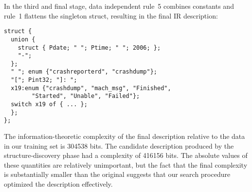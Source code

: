 

In the third and final stage, 
data independent rule~5 combines constants 
and rule~1 flattens the singleton struct, resulting in the final IR
description:

{\small
\begin{verbatim}
struct {
  union {
    struct { Pdate; " "; Ptime; " "; 2006; };
    "-";
  };
  " "; enum {"crashreporterd", "crashdump"};
  "["; Pint32; "]: ";
  x19:enum {"crashdump", "mach_msg", "Finished", 
        "Started", "Unable", "Failed"};
  switch x19 of { ... };
  };
};
\end{verbatim}
}

The information-theoretic complexity of the final description 
relative to the data in our training set is 304538 bits. 
The candidate description produced by the structure-discovery phase
had a complexity of 416156 bits.  The absolute values of these quantities
are relatively unimportant, but the fact that the final complexity
is substantially smaller than the original suggests that our search
procedure optimized the description effectively.



